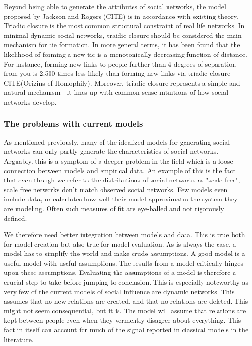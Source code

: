 \documentclass[9pt,twocolumn,twoside]{ilcss}
\begin{document}
Beyond being able to generate the attributes of social networks, the model proposed by Jackson and Rogers (CITE) is in accordance with existing theory. 
Triadic closure is the most common structural constraint of real life networks. In minimal dynamic social networks, traidic closure should be considered the main mechanism for tie formation. 
In more general terms, it has been found that the likelihood of forming a new tie is a monotonically decreasing function of distance. For instance, forming new links to people further than 4 degrees of separation from you is 2.500 times less likely than forming new links via triadic closure CITE(Origins of Homophily).
Moreover, triadic closure represents a simple and natural mechanism - it lines up with common sense intuitions of how social networks develop. 

\subsubsection{The problems with current models}

As mentioned previously, many of the idealized models for generating social networks can only partly generate the characteristics of social networks.
Arguably, this is a symptom of a deeper problem in the field which is a loose connection between models and empirical data.
An example of this is the fact that even though we refer to the distributions of social networks as "scale free", scale free networks don't match observed social networks. 
Few models even include data, or calculates how well their model approximates the system they are modeling. 
Often such measures of fit are eye-balled and not rigorously defined. 

We therefore need better integration between models and data. This is true both for model creation but also true for model evaluation. 
As is always the case, a model has to simplify the world and make crude assumptions. A good model is a useful model with useful assumptions. 
The results from a model critically hinges upon these assumptions. Evaluating the assumptions of a model is therefore a crucial step to take before jumping to conclusion.
This is especially noteworthy as very few of the current models of social influence are dynamic networks. 
This assumes that no new relations are created, and that no relations are deleted. 
This might not seem consequential, but it is. The model will assume that relations are kept between people even when they vermently disagree about everything.
This fact in itself can account for much of the signal reported in classical models in the literature. 
\end{document}
